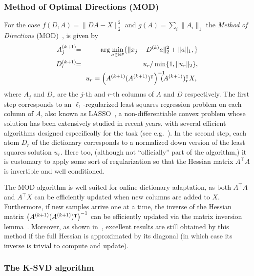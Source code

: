 \documentclass[twocolumn]{IEEEtran}
\theoremstyle{definition}
\def\transp{^\intercal}
\def\reals{\ensuremath{\mathbb{R}}}
\newcommand{\fix}{\marginpar{FIX}}
\begin{document}
\subsubsection{Method of Optimal Directions (MOD)} 
\label{sec:mod}
\fix{it is AtA and XAt, you idiot}

For the case $f(D,A)=\|DA-X\|_2^2$ and $g(A)=\sum_{i}\|A_i\|_1$ the \emph{Method of Directions} (MOD)~\cite{mod}, is given by
\begin{eqnarray}
A_j\iter{k+1}\!\! &=&\!\! \arg\min_{a \in \reals^p} \{ \|x_j - D\iter{k}a \|_2^2 + \|a\|_1, \} \\
D_r\iter{k+1}\!\! &=&\!\! u_r/\min\{1,\|u_r\|_2\},\nonumber\\
\!\!&&\!\!u_r = \left(A\iter{k+1}(A\iter{k+1})\transp\right)^{-1}\!\!\!\!\!(A\iter{k+1})_r\transp{X},\,
\label{eq:mod}
\end{eqnarray}
where $A_j$ and $D_r$ are the $j$-th and $r$-th columns of $A$ and $D$ respectively. The first step corresponds to an $\ell_1$-regularized least squares regression problem on each column of $A$, also known as LASSO~\cite{lasso}, a non-differentiable convex problem whose solution has been extensively studied in recent years, with several efficient algorithms designed especifically for the task (see e.g.~\cite{fista}).
In the second step, each atom $D_r$ of the dictionary corresponds to a normalized down version of the least squares solution $u_r$. Here too, (although not ``officially'' part of the algorithm,) it is customary  to apply some sort of regularization so that the Hessian matrix $A\transp{A}$ is invertible and well conditioned.

The MOD algorithm is well suited for online dictionary adaptation, as both  $A\transp{A}$ and $A\transp{X}$ can be efficiently updated when new columns are added to $X$. Furthermore, if new samples arrive one at a time, the inverse of the Hessian matrix $\left(A\iter{k+1}(A\iter{k+1})\transp\right)^{-1}$ can be efficiently updated via the matrix inversion lemma~\cite{matrix-inv-lemma}. Moreover, as shown in~\cite{online-dl}, excellent results are still obtained by this method if the full Hessian is approximated by its diagonal (in which case its inverse is trivial to compute and update).

\subsubsection{The K-SVD algorithm} 
\label{sec:ksvd}
\end{document}
